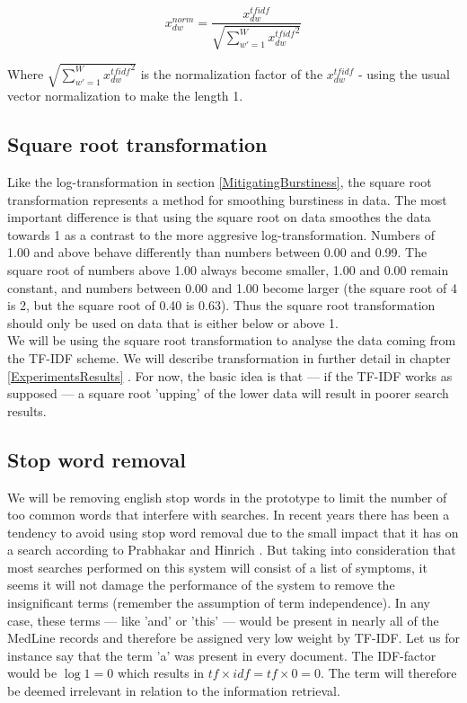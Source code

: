 \[
x_{dw}^{norm} = \frac{x_{dw}^{tfidf}}{\sqrt{\sum_{w\prime = 1}^{W} {x_{dw}^{tfidf}}^{2}}}
\]

Where $\sqrt{\sum_{w\prime = 1}^{W} {x_{dw}^{tfidf}}^{2}}$ is the
normalization factor of the $x_{dw}^{tfidf}$ - using the usual vector
normalization to make the length 1.

\subsection{Square root transformation\label{SquareRoot}}

Like the log-transformation in section \ref{MitigatingBurstiness}, the square
root transformation represents a method for smoothing burstiness in
data. The most important difference is that using the square root on
data smoothes the data towards 1 as a contrast to the more aggresive
log-transformation. Numbers of 1.00 and above behave differently than
numbers between 0.00 and 0.99.  The square root of numbers above 1.00
always become smaller, 1.00 and 0.00 remain constant, and numbers
between 0.00 and 1.00 become larger (the square root of 4 is 2, but
the square root of 0.40 is 0.63).  Thus the square root transformation
should only be used on data that is either below or above 1.\\

We will be using the square root transformation to analyse the data
coming from the TF-IDF scheme. We will describe transformation in
further detail in chapter \ref{ExperimentsResults} . For now, the basic idea is that --- if the TF-IDF
works as supposed --- a square root 'upping' of the lower data will
result in poorer search results.

\subsection{Stop word removal}

We will be removing english stop words in the prototype to limit the
number of too common words that interfere with searches. In recent
years there has been a tendency to avoid using stop word removal due
to the small impact that it has on a search according to Prabhakar and
Hinrich \cite{IntroIR2009}. But taking into consideration that most
searches performed on this system will consist of a list of
symptoms, it seems it will not damage the performance of the system to
remove the insignificant terms (remember the assumption of term
independence). In any case, these terms --- like 'and' or 'this' --- would
be present in nearly all of the MedLine records and therefore be
assigned very low weight by TF-IDF. Let us for instance say that the
term 'a' was present in every document. The IDF-factor would be $\log
1 = 0$ which results in $tf \times idf = tf \times 0 = 0$. The term
will therefore be deemed irrelevant in relation to the information
retrieval.

